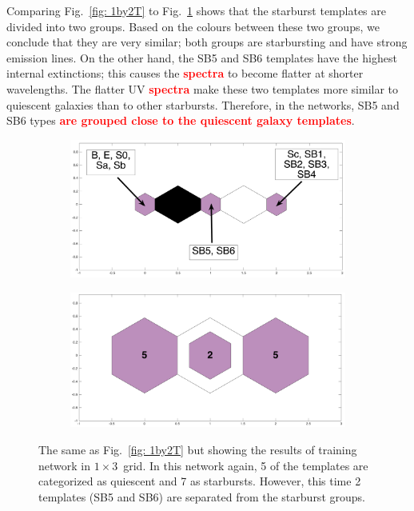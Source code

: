             Comparing Fig.~\ref{fig: 1by2T} to Fig.~\ref{fig: 1by3T} shows that the starburst templates are divided into two groups. 
            Based on the colours between these two groups, we conclude that they are very similar; both groups are starbursting and have strong emission lines.
            On the other hand, the SB5 and SB6 templates have the highest internal extinctions; this causes the \textbf{\textcolor{red}{spectra}} to become flatter at shorter wavelengths. 
            The flatter UV \textbf{\textcolor{red}{spectra}} make these two templates more similar to quiescent galaxies than to other starbursts.
            Therefore, in the networks, SB5 and SB6 types \textbf{\textcolor{red}{are grouped close to the quiescent galaxy templates}}.
                
            \begin{figure}
                \begin{subfigure}[b]{0.45\textwidth}
                    \centering
                    \includegraphics[width=\textwidth]{images0.01/1d/dist_1_by_3.png}
                \end{subfigure}
                \hfill
                \begin{subfigure}[b]{0.45\textwidth}
                     \includegraphics[width=\textwidth]{images0.01/1d/hit_t_1_by_3.png}
                \end{subfigure}
                \caption[Results of training network in $1\times3$~grid]{The same as Fig.~\ref{fig: 1by2T} but showing the results of training network in $1\times3$~grid. In this network again, 5 of the \citet{Kinney96} templates are categorized as quiescent and 7 as starbursts. However, this time 2 templates (SB5 and SB6) are separated from the starburst groups.}
                 \label{fig: 1by3T}
            \end{figure}
           
